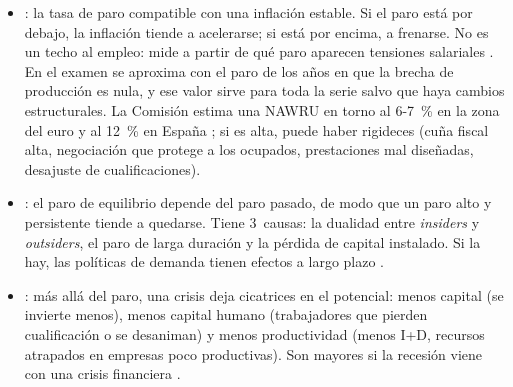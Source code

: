 \documentclass[11pt]{article}
\begin{document}
\begin{itemize}
\item {}: la tasa de paro compatible con una inflación estable. Si el paro está por debajo, la inflación tiende a acelerarse; si está por encima, a frenarse. No es un techo al empleo: mide a partir de qué paro aparecen tensiones salariales . En el examen se aproxima con el paro de los años en que la brecha de producción es nula, y ese valor sirve para toda la serie salvo que haya cambios estructurales. La Comisión estima una NAWRU en torno al 6-7~\% en la zona del euro y al 12~\% en España \parencite{CE2026AMECO}; si es alta, puede haber rigideces (cuña fiscal alta, negociación que protege a los ocupados, prestaciones mal diseñadas, desajuste de cualificaciones).
\item {}: el paro de equilibrio depende del paro pasado, de modo que un paro alto y persistente tiende a quedarse. Tiene 3~causas: la dualidad entre \emph{insiders} y \emph{outsiders}, el paro de larga duración y la pérdida de capital instalado. Si la hay, las políticas de demanda tienen efectos a largo plazo .
\item {}: más allá del paro, una crisis deja cicatrices en el potencial: menos capital (se invierte menos), menos capital humano (trabajadores que pierden cualificación o se desaniman) y menos productividad (menos I+D, recursos atrapados en empresas poco productivas). Son mayores si la recesión viene con una crisis financiera \parencite{FMI2021WEOabr}.
\end{itemize}
\end{document}
